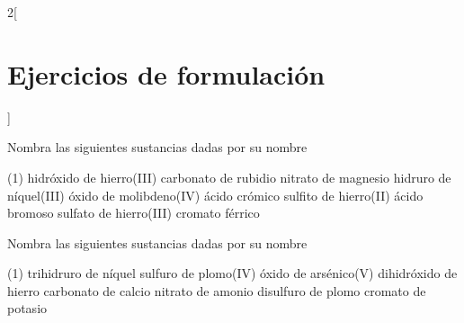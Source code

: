\documentclass[10pt]{article}
\begin{document}
\begin{multicols}{2}[
  \section{Ejercicios de formulación}
  ]
  \begin{exercise}[
      tags    = {inorgánica,formulación,múltiple,2B},
      topics  = {química inorgánica,formulación,nomenclatura},
      source  = {Química 2B SAN 2016, p372, e18},
    ]

    Nombra las siguientes sustancias dadas por su nombre

    \begin{tasks}(1)
      \task hidróxido de hierro(III)
      \task carbonato de rubidio
      \task nitrato de magnesio
      \task hidruro de níquel(III)
      \task óxido de molibdeno(IV)
      \task ácido crómico
      \task sulfito de hierro(II)
      \task ácido bromoso
      \task sulfato de hierro(III)
      \task cromato férrico
    \end{tasks}
  \end{exercise}

  \begin{exercise}[
      tags    = {inorgánica,formulación,múltiple,2B},
      topics  = {química inorgánica,formulación,nomenclatura},
      source  = {Química 2B SAN 2016, p372, e19},
    ]

    Nombra las siguientes sustancias dadas por su nombre

    \begin{tasks}(1)
      \task trihidruro de níquel
      \task sulfuro de plomo(IV)
      \task óxido de arsénico(V)
      \task dihidróxido de hierro
      \task carbonato de calcio
      \task nitrato de amonio
      \task disulfuro de plomo
      \task cromato de potasio
    \end{tasks}
  \end{exercise}


\end{multicols}
\end{document}
